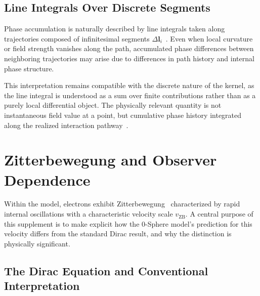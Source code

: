 \documentclass[12pt,letterpaper]{article}
\begin{document}
\subsection{Line Integrals Over Discrete Segments}

Phase accumulation is naturally described by line integrals taken along trajectories composed of infinitesimal segments $\Delta \mathbf{l}_i$~\cite{hanamura18203433}. Even when local curvature or field strength vanishes along the path, accumulated phase differences between neighboring trajectories may arise due to differences in path history and internal phase structure.

This interpretation remains compatible with the discrete nature of the kernel, as the line integral is understood as a sum over finite contributions rather than as a purely local differential object. The physically relevant quantity is not instantaneous field value at a point, but cumulative phase history integrated along the realized interaction pathway~\cite{hanamura18067760}.


\section{Zitterbewegung and Observer Dependence}

\justifying
Within the model, electrons exhibit Zitterbewegung~\cite{Schrodinger1930} characterized by rapid internal oscillations with a characteristic velocity scale $v_{\mathrm{ZB}}$. A central purpose of this supplement is to make explicit how the 0-Sphere model's prediction for this velocity differs from the standard Dirac result, and why the distinction is physically significant.

\subsection{The Dirac Equation and Conventional Interpretation}
\end{document}
